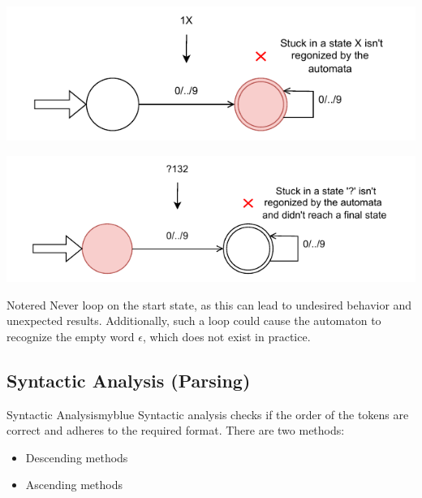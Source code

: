 \vspace{0.85cm}

 \hspace{5.65cm}   \includegraphics{Chapters/Examples/Intro/ex4.3.drawio.pdf}

\vspace{0.85cm}
  \hspace{5.65cm}  \includegraphics{Chapters/Examples/Intro/ex4.4.drawio.pdf}


\vspace{0.85cm}

\begin{prettyBox}{Note}{red}
Never loop on the start state, as this can lead to undesired behavior and unexpected results. 
Additionally, such a loop could cause the automaton to recognize the empty word \(\epsilon\), which does not exist in practice.
\end{prettyBox}


\subsection{Syntactic Analysis (Parsing)}
\begin{prettyBox}{Syntactic Analysis}{myblue}
Syntactic analysis checks if the order of the tokens are correct and adheres to the required format. There are two methods:  
\begin{itemize}
    \item Descending methods  
    \item Ascending methods  
\end{itemize}
\end{prettyBox}

